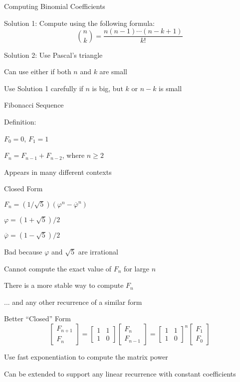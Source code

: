 \documentclass[13pt,onlymath]{beamer}
\begin{document}
\begin{frame}{Computing Binomial Coefficients}
\BIT
\item Solution 1: Compute using the following formula:
\[
\binom{n}{k} = \frac{n(n-1) \cdots (n-k+1)}{k!}
\]
\item Solution 2: Use Pascal's triangle

\item Can use either if both $n$ and $k$ are small
\item Use Solution 1 carefully if $n$ is big, but $k$ or $n-k$ is small
\EIT
\end{frame}

\begin{frame}{Fibonacci Sequence}
\BIT
\item Definition:
\BIT
\item $F_0 = 0$, $F_1 = 1$
\item $F_n = F_{n-1} + F_{n-2}$, where $n \ge 2$
\EIT
\item Appears in many different contexts
\EIT
\end{frame}

\begin{frame}{Closed Form}
\BIT
\item $F_n = (1/\sqrt{5})(\varphi^n - \overline{\varphi}^n)$
\BIT
\item $\varphi = (1+\sqrt{5})/2$
\item $\overline{\varphi} = (1-\sqrt{5})/2$
\EIT
\item Bad because $\varphi$ and $\sqrt{5}$ are irrational
\item Cannot compute the exact value of $F_n$ for large $n$

\item There is a more stable way to compute $F_n$
\BIT
\item ... and any other recurrence of a similar form
\EIT
\EIT
\end{frame}

\begin{frame}{Better ``Closed'' Form}
\[
\left[\begin{array}{c}F_{n+1} \\ F_n \end{array} \right] = 
\left[\begin{array}{cc}1&1\\1&0 \end{array} \right] \left[\begin{array}{c}F_n \\ F_{n-1} \end{array} \right] =
\left[\begin{array}{cc}1&1\\1&0 \end{array} \right]^n \left[\begin{array}{c}F_1 \\ F_0 \end{array} \right]
\]
\BIT
\item Use fast exponentiation to compute the matrix power
\item Can be extended to support any linear recurrence with constant coefficients
\EIT
\end{frame}
\end{document}
